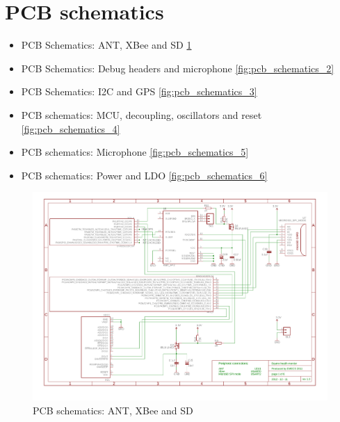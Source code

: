 \clearpage

\section{PCB schematics}
\label{sec:pcb_schematics}
\begin{itemize}
\item PCB Schematics: ANT, XBee and SD \ref{fig:pcb_schematics_1}
\item PCB Schematics: Debug headers and microphone \ref{fig:pcb_schematics_2}
\item PCB Schematics: I2C and GPS \ref{fig:pcb_schematics_3}
\item PCB schematics: MCU, decoupling, oscillators and reset \ref{fig:pcb_schematics_4}
\item PCB schematics: Microphone \ref{fig:pcb_schematics_5}
\item PCB schematics: Power and LDO \ref{fig:pcb_schematics_6}
\end{itemize}

\begin{figure}[htb]
\centering
\includegraphics[width=\columnwidth]{Images/pcb_ant}
\caption{PCB schematics: ANT, XBee and SD}
\label{fig:pcb_schematics_1}
\end{figure}

